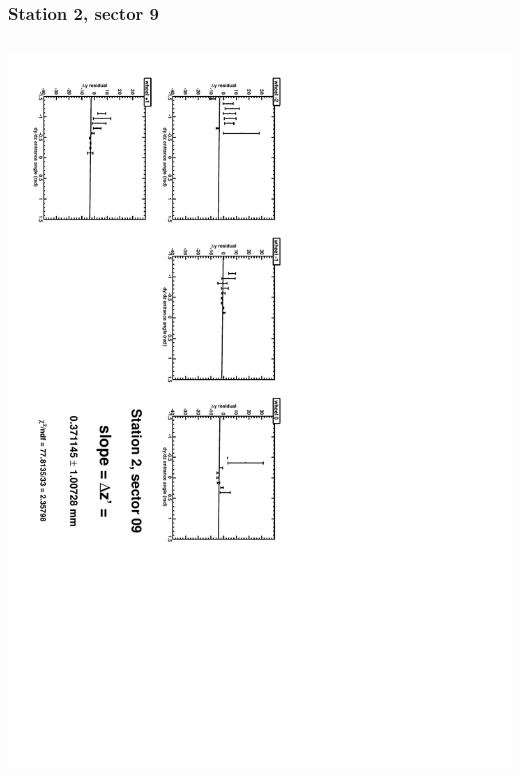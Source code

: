 \documentclass[compress]{beamer}
\begin{document}
\begin{frame}
\frametitle{Station 2, sector 9}
\begin{columns}
\includegraphics[height=\linewidth, angle=90]{zfits/zfit_2_09.pdf}


\end{columns}
\end{frame}
\end{document}
